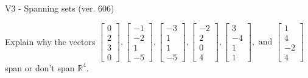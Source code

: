 \begin{exercise}
  \begin{exerciseTitle}V3 - Spanning sets (ver. 606)\end{exerciseTitle}
  \begin{exerciseStatement}
    Explain why the vectors \(\left[\begin{array}{r}
0 \\
2 \\
3 \\
0
\end{array}\right] , \left[\begin{array}{r}
-1 \\
-2 \\
1 \\
-5
\end{array}\right] , \left[\begin{array}{r}
-3 \\
1 \\
1 \\
-5
\end{array}\right] , \left[\begin{array}{r}
-2 \\
2 \\
0 \\
4
\end{array}\right] , \left[\begin{array}{r}
3 \\
-4 \\
1 \\
1
\end{array}\right] , \text{ and } \left[\begin{array}{r}
1 \\
4 \\
-2 \\
4
\end{array}\right]\) span or don't span \(\mathbb{R}^4\). 
	



\end{exerciseStatement}
\end{exercise}
